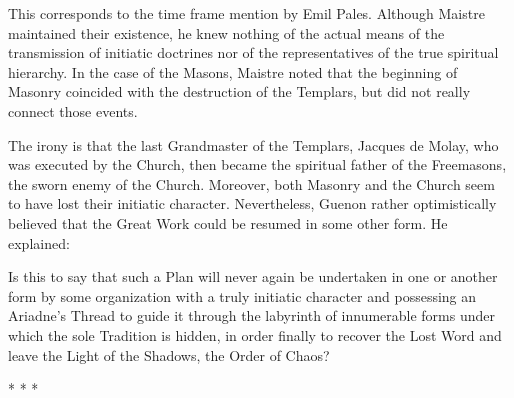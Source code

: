 This corresponds to the time frame mention by Emil Pales. Although Maistre maintained their existence, he knew nothing of the actual means of the transmission of initiatic doctrines nor of the representatives of the true spiritual hierarchy. In the case of the Masons, Maistre noted that the beginning of Masonry coincided with the destruction of the Templars, but did not really connect those events.

The irony is that the last Grandmaster of the Templars, Jacques de Molay, who was executed by the Church, then became the spiritual father of the Freemasons, the sworn enemy of the Church. Moreover, both Masonry and the Church seem to have lost their initiatic character. Nevertheless, Guenon rather optimistically believed that the Great Work could be resumed in some other form. He explained:

\begin{quotex}
Is this to say that such a Plan will never again be undertaken in one or another form by some organization with a truly initiatic character and possessing an Ariadne's Thread to guide it through the labyrinth of innumerable forms under which the sole Tradition is hidden, in order finally to recover the Lost Word and leave the Light of the Shadows, the Order of Chaos?
\end{quotex}




\begin{center}* * *\end{center}

